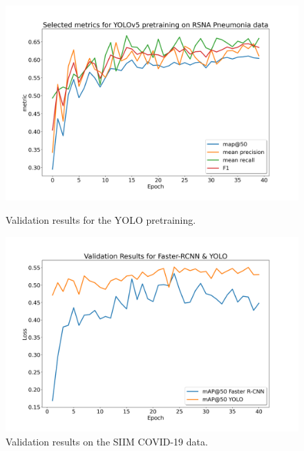 \begin{figure}[h!]
	\begin{minipage}[b]{.5\linewidth} %
		\includegraphics[width=\linewidth]{img/metrics_giou_pretrained_yolo_40.png}
		\caption{Validation results for the \ac{YOLO} pretraining.}
		\label{fig:yolo_pretraining_results}
	\end{minipage}
	\begin{minipage}[b]{.5\linewidth} %
		\includegraphics[width=\linewidth]{img/eval_results_ap_only_fasterrcnn_yolo.png}
		\caption{Validation results on the SIIM COVID-19 data.}
		\label{fig:yolo_frcnn_results}
	\end{minipage}
\end{figure}

